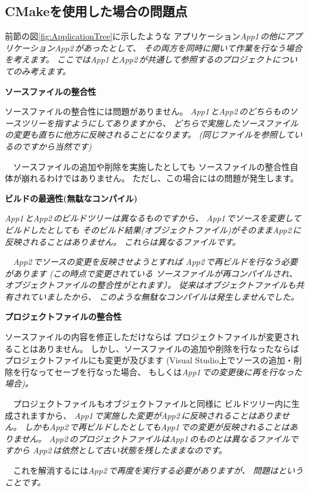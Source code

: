 \subsection{CMakeを使用した場合の問題点}
\label{subsec:Problems}

\def\App#1{\it{App#1\,}}
\def\App#1{\it{App#1\,}}

\noindent
前節の図\ref{fig:ApplicationTree}に示したような
アプリケーション\App{1}の他にアプリケーション\App{2}があったとして、
その両方を同時に開いて作業を行なう場合を考えます。
ここでは\App{1}と\App{2}が共通して参照する\SprLib のプロジェクトについてのみ考えます。

\bigskip
\noindent
\bf{ソースファイルの整合性}
\begin{narrow}[20pt]
	ソースファイルの整合性には問題がありません。
	\App{1}と\App{2}のどちらも\SprLib のソースツリーを指すようにしてありますから、
	どちらで実施したソースファイルの変更も直ちに他方に反映されることになります。
	(同じファイルを参照しているのですから当然です)

	　ソースファイルの追加や削除を実施したとしても
	ソースファイルの整合性自体が崩れるわけではありません。
	ただし、この場合にはの問題が発生します。
\end{narrow}

\medskip
\noindent
\bf{ビルドの最適性(無駄なコンパイル)}
\begin{narrow}[20pt]
	\App{1}と\App{2}のビルドツリーは異なるものですから、
	\App{1}でソースを変更してビルドしたとしても
	そのビルド結果(オブジェクトファイル)がそのまま\App{2}に反映されることはありません。
	これらは異なるファイルです。

	　\App{2}でソースの変更を反映させようとすれば
	\App{2}で再ビルドを行なう必要があります (この時点で変更されている
	ソースファイルが再コンパイルされ、オブジェクトファイルの整合性がとれます）。
	従来はオブジェクトファイルも共有されていましたから、
	このような無駄なコンパイルは発生しませんでした。
\end{narrow}

\medskip
\noindent
\bf{プロジェクトファイルの整合性}
\begin{narrow}[20pt]
	ソースファイルの内容を修正しただけならば
	プロジェクトファイルが変更されることはありません。
	しかし、ソースファイルの追加や削除を行なったならば
	プロジェクトファイルにも変更が及びます
	(Visual Studio上でソースの追加・削除を行なってセーブを行なった場合、
	もしくは\App{1}での変更後に再\cmake を行なった場合)。

	　プロジェクトファイルもオブジェクトファイルと同様に
	ビルドツリー内に生成されますから、
	\App{1}で実施した変更が\App{2}に反映されることはありません。
	しかも\App{2}で再ビルドしたとしても\App{1}での変更が反映されることはありません。
	\App{2}のプロジェクトファイルは\App{1}のものとは異なるファイルですから
	\App{2}は依然として古い状態を残したままなのです。

	\indent
	　これを解消するには\App{2}で再度\cmake を実行する必要がありますが、
	問題はということです。
\end{narrow}

